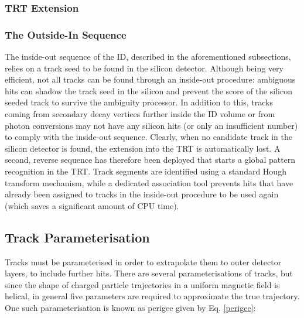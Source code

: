 \subsubsection{TRT Extension}




\subsubsection{The Outside-In Sequence}
The inside-out sequence of the ID, described in the aforementioned subsections, relies on a track seed to be found in the silicon detector. Although being very efficient, not all tracks can be found through an inside-out procedure: ambiguous hits can shadow the track seed in the silicon and prevent the score of the silicon seeded track to survive the ambiguity processor. In addition to this, tracks coming from secondary decay vertices further inside the ID volume or from photon conversions may not have any silicon hits (or only an insufficient number) to comply with the inside-out sequence. Clearly, when no candidate track in the silicon detector is found, the extension into the TRT is automatically lost. A second, reverse sequence has therefore been deployed that starts a global pattern recognition in the TRT. Track segments are identified using a standard Hough transform mechanism, while a dedicated association tool prevents hits that have already been assigned to tracks in the inside-out procedure to be used again (which saves a significant amount of CPU time).



\subsection{Track Parameterisation}
\label{track-parameterisation}

Tracks must be parameterised in order to extrapolate them to outer detector layers, to include further hits. There are several parameterisations of tracks, but since the shape of charged particle trajectories in a uniform magnetic field is helical, in general five parameters are required to approximate the true trajectory. One such parameterisation is known as perigee given by Eq. \ref{perigee}:

